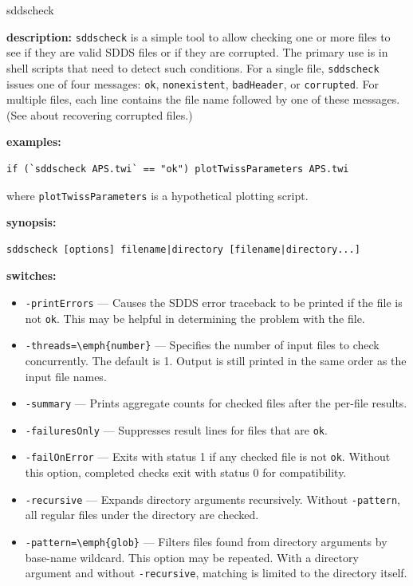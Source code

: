 \begin{sddsprog}{sddscheck}
  \item \textbf{description:} \verb|sddscheck| is a simple tool to allow checking one or more files to see if they are valid SDDS files or if they are corrupted. The primary use is in shell scripts that need to detect such conditions. For a single file, \verb|sddscheck| issues one of four messages: \verb|ok|, \verb|nonexistent|, \verb|badHeader|, or \verb|corrupted|. For multiple files, each line contains the file name followed by one of these messages. (See  about recovering corrupted files.)
  \item \textbf{examples:}
    \begin{verbatim}
if (`sddscheck APS.twi` == "ok") plotTwissParameters APS.twi
    \end{verbatim}
    where \verb|plotTwissParameters| is a hypothetical plotting script.
  \item \textbf{synopsis:}
    \begin{verbatim}
sddscheck [options] filename|directory [filename|directory...]
    \end{verbatim}
  \item \textbf{switches:}
    \begin{itemize}
      \item \verb|-printErrors| --- Causes the SDDS error traceback to be printed if the file is not \verb|ok|. This may be helpful in determining the problem with the file.
      \item \verb|-threads=\emph{number}| --- Specifies the number of input files to check concurrently. The default is 1. Output is still printed in the same order as the input file names.
      \item \verb|-summary| --- Prints aggregate counts for checked files after the per-file results.
      \item \verb|-failuresOnly| --- Suppresses result lines for files that are \verb|ok|.
      \item \verb|-failOnError| --- Exits with status 1 if any checked file is not \verb|ok|. Without this option, completed checks exit with status 0 for compatibility.
      \item \verb|-recursive| --- Expands directory arguments recursively. Without \verb|-pattern|, all regular files under the directory are checked.
      \item \verb|-pattern=\emph{glob}| --- Filters files found from directory arguments by base-name wildcard. This option may be repeated. With a directory argument and without \verb|-recursive|, matching is limited to the directory itself.

\end{itemize}
\end{sddsprog}
